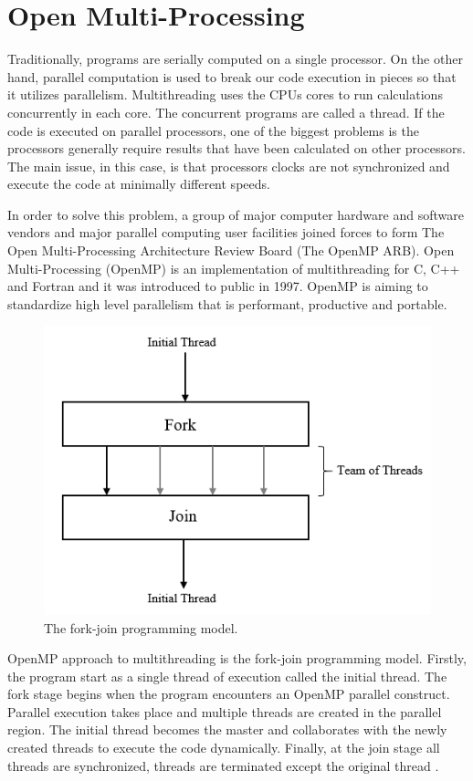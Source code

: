 \documentclass[12pt, oneside]{book}
\theoremstyle{plain}
\theoremstyle{definition}
\begin{document}
\section{Open Multi-Processing}
Traditionally, programs are serially computed on a single processor. On the other hand, parallel computation is used to break our code execution in pieces so that it utilizes parallelism. Multithreading uses the CPUs cores to run calculations concurrently in each core. The concurrent programs are called a thread. If the code is executed on parallel processors, one of the biggest problems is the processors generally require results that have been calculated on other processors. The main issue, in this case, is that processors clocks are not synchronized and execute the code at minimally different speeds.

In order to solve this problem, a group of major computer hardware and software vendors and major parallel computing user facilities joined forces to form The Open Multi-Processing Architecture Review Board (The OpenMP ARB)\cite{openmpfaq}. Open Multi-Processing (OpenMP) is an implementation of multithreading for C, C++ and Fortran and it was introduced to public in 1997. OpenMP is aiming to standardize high level parallelism that is performant, productive and portable.

\begin{figure}[!htb]
    \centering
        \includegraphics[scale=0.6]{openmp.png}
    \caption{The fork-join programming model.}
\end{figure}

 OpenMP approach to multithreading is the fork-join programming model. Firstly, the program start as a single thread of execution called the initial thread. The fork stage begins when the program encounters an OpenMP parallel construct. Parallel execution takes place and multiple threads are created in the parallel region. The initial thread becomes the master and collaborates with the newly created threads to execute the code dynamically. Finally, at the join stage all threads are synchronized, threads are terminated except the original thread \cite{openmp}.
\end{document}

